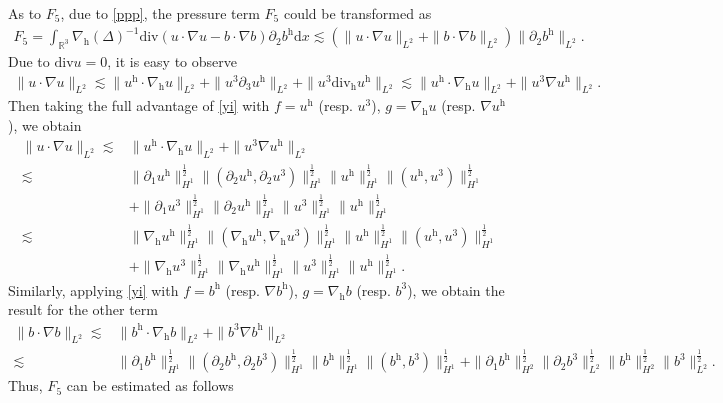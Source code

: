 \documentclass[11pt]{amsart}
\theoremstyle{definition}
\newcommand{\R}{\mathbb{R}}
\newcommand{\h}{\mathrm{h}}
\newcommand{\nablah}{\nabla_{\mathrm{h}}}
\numberwithin{equation}{section}
\begin{document}
As to $F_5$, due to \eqref{ppp}, the pressure term $F_5$ could be transformed as
\begin{align*}
	F_5=\int_{\R^3} \nabla_\h(\Delta)^{-1}\mathrm{div}\left(u\cdot\nabla u-b\cdot\nabla b\right) \partial_2 b^\h \mathrm{d}x\lesssim
	\left(\|u\cdot\nabla u\|_{L^2}+\|b\cdot\nabla b\|_{L^2}\right)\|\partial_2 b^\h\|_{L^2}.
\end{align*}
Due to $\mathrm{div}u=0$, it is easy to observe
\begin{align*}
	\|u \cdot \nabla u\|_{L^2} \lesssim \|u^\h \cdot \nablah u\|_{L^2} + \|u^3 \partial_3 u^\h\|_{L^2} + \|u^3 \mathrm{div_h} u^\h\|_{L^2}\lesssim \|u^\h \cdot \nablah u\|_{L^2} + \|u^3 \nabla u^\h\|_{L^2}.
\end{align*}
Then taking the full advantage of \eqref{yi} with $f=u^\h$ (resp. $u^3$), $g=\nabla_\h u$ (resp. $\nabla u^\h$), we obtain
\begin{align*}
	\|u\cdot\nabla u\|_{L^2}\lesssim&\|u^\h\cdot\nabla_\h u\|_{L^2}+\|u^3\nabla u^\h\|_{L^2}\\
	\lesssim& \|\partial_1u^\h\|_{H^1} ^\frac12\|(\partial_2u^\h,\partial_2u^3)\|_{H^1} ^\frac12\| u^\h\|_{H^1} ^\frac12\| (u^\h,u^3)\|_{H^1} ^\frac12\\
	&+\|\partial_1u^3\|_{H^1} ^\frac12\|\partial_2u^\h\|_{H^1} ^\frac12\| u^3\|_{H^1} ^\frac12\| u^\h\|_{H^1} ^\frac12\\
	\lesssim& \|\nablah u^\h\|_{H^1} ^\frac12\|(\nablah u^\h,\nablah u^3)\|_{H^1} ^\frac12\| u^\h\|_{H^1} ^\frac12\| (u^\h,u^3)\|_{H^1} ^\frac12\\
	&+\|\nablah u^3\|_{H^1} ^\frac12\|\nablah u^\h\|_{H^1} ^\frac12\| u^3\|_{H^1} ^\frac12\| u^\h\|_{H^1} ^\frac12.
\end{align*}
Similarly, applying \eqref{yi} with $f=b^\h$ (resp. $\nabla b^\h$), $g=\nabla_\h b$ (resp. $b^3$), we obtain the result for the other term
\begin{align*}
	\|b\cdot\nabla b\|_{L^2}\lesssim&\|b^\h\cdot\nabla_\h b\|_{L^2}+\|b^3\nabla b^\h\|_{L^2}\\
	\lesssim& \|\partial_1b^\h\|_{H^1} ^\frac12\|(\partial_2b^\h,\partial_2b^3)\|_{H^1} ^\frac12\| b^\h\|_{H^1} ^\frac12\| (b^\h,b^3)\|_{H^1} ^\frac12+\|\partial_1b^\h\|_{H^2} ^\frac12\|\partial_2b^3\|_{L^2} ^\frac12\| b^\h\|_{H^2} ^\frac12\| b^3\|_{L^2} ^\frac12.
\end{align*}
Thus, $F_5$ can be estimated as follows
\end{document}
